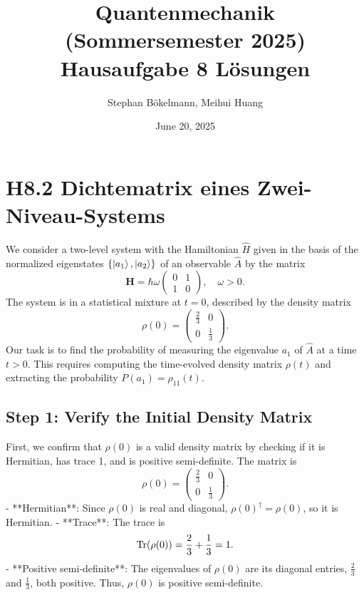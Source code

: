 \documentclass[a4paper,12pt]{article}
\begin{document}
\title{Quantenmechanik (Sommersemester 2025) \\ Hausaufgabe 8 Lösungen}
\author{Stephan Bökelmann, Meihui Huang}
\date{June 20, 2025}
\maketitle

\section*{H8.2 Dichtematrix eines Zwei-Niveau-Systems}

We consider a two-level system with the Hamiltonian \(\hat{H}\) given in the basis of the normalized eigenstates \(\{\ket{a_1}, \ket{a_2}\}\) of an observable \(\hat{A}\) by the matrix
\[
\boldsymbol{H} = \hbar \omega \begin{pmatrix} 0 & 1 \\ 1 & 0 \end{pmatrix}, \quad \omega > 0.
\]
The system is in a statistical mixture at \(t=0\), described by the density matrix
\[
\rho(0) = \begin{pmatrix} \frac{2}{3} & 0 \\ 0 & \frac{1}{3} \end{pmatrix}.
\]
Our task is to find the probability of measuring the eigenvalue \(a_1\) of \(\hat{A}\) at a time \(t > 0\). This requires computing the time-evolved density matrix \(\rho(t)\) and extracting the probability \(P(a_1) = \rho_{11}(t)\).

\subsection*{Step 1: Verify the Initial Density Matrix}

First, we confirm that \(\rho(0)\) is a valid density matrix by checking if it is Hermitian, has trace 1, and is positive semi-definite. The matrix is
\[
\rho(0) = \begin{pmatrix} \frac{2}{3} & 0 \\ 0 & \frac{1}{3} \end{pmatrix}.
\]
- **Hermitian**: Since \(\rho(0)\) is real and diagonal, \(\rho(0)^\dagger = \rho(0)\), so it is Hermitian.
- **Trace**: The trace is
\[
\Tr(\rho(0)) = \frac{2}{3} + \frac{1}{3} = 1.
\]
- **Positive semi-definite**: The eigenvalues of \(\rho(0)\) are its diagonal entries, \(\frac{2}{3}\) and \(\frac{1}{3}\), both positive. Thus, \(\rho(0)\) is positive semi-definite.
\end{document}
